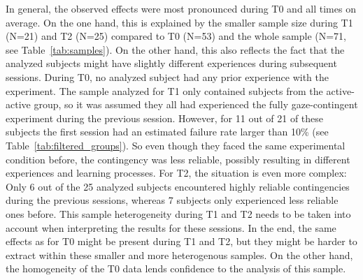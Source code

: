 \documentclass[a4paper]{scrreprt}
\begin{document}
In general, the observed effects were most pronounced during T0 and all times on average. On the one hand, this is explained by the smaller sample size during T1 (N=21) and T2 (N=25) compared to T0 (N=53) and the whole sample (N=71, see Table~\ref{tab:samples}). On the other hand, this also reflects the fact that the analyzed subjects might have slightly different experiences during subsequent sessions. During T0, no analyzed subject had any prior experience with the experiment. The sample analyzed for T1 only contained subjects from the active-active group, so it was assumed they all had experienced the fully gaze-contingent experiment during the previous session. However, for 11 out of 21 of these subjects the first session had an estimated failure rate larger than 10\% (see Table~\ref{tab:filtered_groups}). So even though they faced the same experimental condition before, the contingency was less reliable, possibly resulting in different experiences and learning processes. For T2, the situation is even more complex: Only 6 out of the 25 analyzed subjects encountered highly reliable contingencies during the previous sessions, whereas 7 subjects only experienced less reliable ones before. This sample heterogeneity during T1 and T2 needs to be taken into account when interpreting the results for these sessions. In the end, the same effects as for T0 might be present during T1 and T2, but they might be harder to extract within these smaller and more heterogenous samples. On the other hand, the homogeneity of the T0 data lends confidence to the analysis of this sample.
\end{document}
